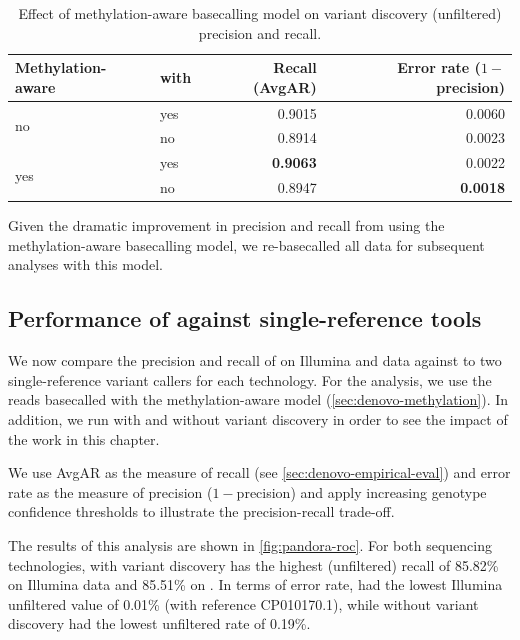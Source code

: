 \begin{table}
\centering
\begin{tabular}{@{}llrr@{}}
\toprule
    Methylation-aware    & with \denovo{} & Recall (AvgAR)  & Error rate ($1-$precision) \\ \midrule
\multirow{2}{*}{no}  & yes                   & 0.9015          & 0.0060                   \\
                     & no                    & 0.8914          & 0.0023                   \\
\multirow{2}{*}{yes} & yes                   & \textbf{0.9063} & 0.0022                   \\
                     & no                    & 0.8947          & \textbf{0.0018}          \\ \cmidrule(l){2-4} 
\end{tabular}
    \caption{Effect of \ont{} methylation-aware basecalling model on \pandora{} \denovo{} variant discovery (unfiltered) precision and recall.}
\label{tab:denovo-methylation}
\end{table}

\noindent
Given the dramatic improvement in precision and recall from using the methylation-aware basecalling model, we re-basecalled all data for subsequent analyses with this model.

\subsection{Performance of \pandora{} against single-reference tools}

We now compare the precision and recall of \pandora{} on Illumina and \ont{} data against to two single-reference variant callers for each technology. For the \ont{} analysis, we use the reads basecalled with the methylation-aware model (\autoref{sec:denovo-methylation}). In addition, we run \pandora{} with and without \denovo{} variant discovery in order to see the impact of the work in this chapter.

We use AvgAR as the measure of recall (see \autoref{sec:denovo-empirical-eval}) and error rate as the measure of precision ($1-$precision) and apply increasing genotype confidence thresholds to illustrate the precision-recall trade-off. 

The results of this analysis are shown in \autoref{fig:pandora-roc}. For both sequencing technologies, \pandora{} with \denovo{} variant discovery has the highest (unfiltered) recall of 85.82\% on Illumina data and 85.51\% on \ont{}. In terms of error rate,  had the lowest Illumina unfiltered value of 0.01\% (with reference CP010170.1), while \pandora{} without \denovo{} variant discovery had the lowest \ont{} unfiltered rate of 0.19\%. 

